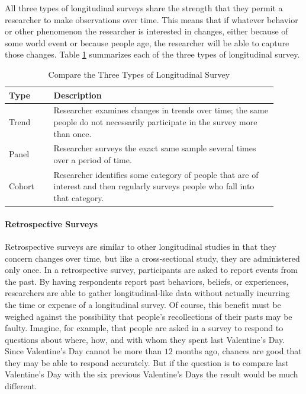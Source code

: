 All three types of longitudinal surveys share the strength that they permit a researcher to make observations over time. This means that if whatever behavior or other phenomenon the researcher is interested in changes, either because of some world event or because people age, the researcher will be able to capture those changes. Table \ref{tab08.01} summarizes each of the three types of longitudinal survey.

\begin{table}[H]
	\centering
	\begin{tabularx}{0.95\linewidth}{p{0.15\linewidth}p{0.75\linewidth}}
		\toprule
		\textbf{Type} & \textbf{Description} \\
		\midrule
		Trend & Researcher examines changes in trends over time; the same people do not necessarily participate in the survey more than once. \\
		Panel & Researcher surveys the exact same sample several times over a period of time. \\
		Cohort & Researcher identifies some category of people that are of interest and then regularly surveys people who fall into that category.\\
		\bottomrule
	\end{tabularx}
	\caption{Compare the Three Types of Longitudinal Survey}
	\label{tab08.01}
\end{table}

\paragraph{Retrospective Surveys}

Retrospective surveys are similar to other longitudinal studies in that they concern changes over time, but like a cross-sectional study, they are administered only once. In a retrospective survey, participants are asked to report events from the past. By having respondents report past behaviors, beliefs, or experiences, researchers are able to gather longitudinal-like data without actually incurring the time or expense of a longitudinal survey. Of course, this benefit must be weighed against the possibility that people's recollections of their pasts may be faulty. Imagine, for example, that people are asked in a survey to respond to questions about where, how, and with whom they spent last Valentine's Day. Since Valentine's Day cannot be more than $ 12 $ months ago, chances are good that they may be able to respond accurately. But if the question is to compare last Valentine's Day with the six previous Valentine's Days the result would be much different.

